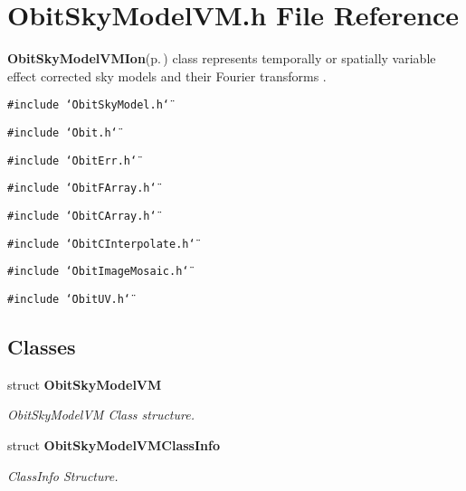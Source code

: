 \section{Obit\-Sky\-Model\-VM.h File Reference}
\label{ObitSkyModelVM_8h}
{\bf Obit\-Sky\-Model\-VMIon}{\rm (p.\,\pageref{structObitSkyModelVMIon})} class represents temporally or spatially variable effect corrected sky models and their Fourier transforms . 

{\tt \#include \char`\"{}Obit\-Sky\-Model.h\char`\"{}}\par
{\tt \#include \char`\"{}Obit.h\char`\"{}}\par
{\tt \#include \char`\"{}Obit\-Err.h\char`\"{}}\par
{\tt \#include \char`\"{}Obit\-FArray.h\char`\"{}}\par
{\tt \#include \char`\"{}Obit\-CArray.h\char`\"{}}\par
{\tt \#include \char`\"{}Obit\-CInterpolate.h\char`\"{}}\par
{\tt \#include \char`\"{}Obit\-Image\-Mosaic.h\char`\"{}}\par
{\tt \#include \char`\"{}Obit\-UV.h\char`\"{}}\par
\subsection*{Classes}
\begin{CompactItemize}
\item 
struct {\bf Obit\-Sky\-Model\-VM}
\begin{CompactList}\small\item\em Obit\-Sky\-Model\-VM Class structure. \item\end{CompactList}\item 
struct {\bf Obit\-Sky\-Model\-VMClass\-Info}
\begin{CompactList}\small\item\em Class\-Info Structure. \item\end{CompactList}\end{CompactItemize}
